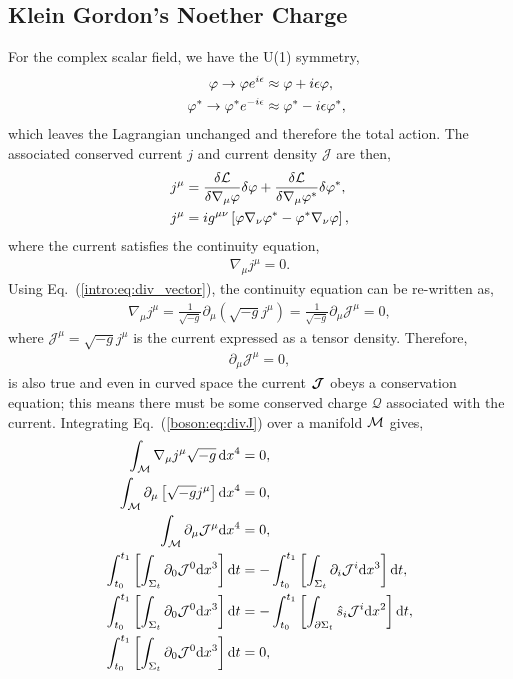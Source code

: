 \subsection{Klein Gordon's Noether Charge}
For the complex scalar field, we have the U(1) symmetry,
\begin{align}
\varphi \rightarrow \varphi e^{i\epsilon} &\approx \varphi + i\epsilon \varphi , \\ 
\quad\varphi^* \rightarrow \varphi^* e^{-i\epsilon}  &\approx \varphi^* - i\epsilon \varphi^*,
\end{align}
which leaves the Lagrangian unchanged and therefore the total action. The associated conserved current $j$ and current density $\mathcal{J}$ are then,
\begin{align} 
j^\mu &= \frac{\delta \mathcal{L}}{\delta \nabla_\mu\varphi}\delta \varphi + \frac{\delta \mathcal{L}}{\delta \nabla_\mu \varphi^*}\delta \varphi^*,\\
 j^\mu &=  ig^{\mu\nu}\left[\varphi\nabla_\nu\varphi^* - \varphi^*\nabla_\nu\varphi\right],
  \end{align}
  where the current satisfies the continuity equation,
\begin{align}
\nabla_\mu j^\mu = 0.
 \end{align}
Using Eq.~(\ref{intro:eq:div_vector}), the continuity equation can be re-written as,
\begin{align}
\nabla_\mu j^\mu = \frac{1}{\sqrt{-g}} \partial_\mu \left( \sqrt{-g} j^\mu \right) = \frac{1}{\sqrt{-g}} \partial_\mu \mathcal{J}^\mu = 0,
 \end{align}
 where $\mathcal{J}^\mu = \sqrt{-g}j^\mu$ is the current expressed as a tensor density. Therefore,
\begin{align}
\partial_\mu \mathcal{J}^\mu =0,\label{boson:eq:divJ}
 \end{align}
is also true and even in curved space the current $\boldsymbol{\mathcal{J}}$ obeys a conservation equation; this means there must be some conserved charge $\mathcal{Q}$ associated with the current. Integrating Eq.~(\ref{boson:eq:divJ}) over a manifold $\mathcal{M}$ gives,
\begin{align}
\int_{\mathcal{M}} \nabla_\mu j^\mu \sqrt{-g}\,\dd x^4 &= 0 ,\\
\int_{\mathcal{M}} \partial_\mu \left[\sqrt{-g} j^{\mu} \right] \dd x^4 &=0,\\
 \int_{\mathcal{M}}\partial_\mu \mathcal{J}^\mu \dd x^4&=0, \\ 
 \int^{t_1}_{t_0}\left[\int_{\Sigma_t} \partial_0 \mathcal{J}^0 \dd x^3 \right]\dd t &= -\int^{t_1}_{t_0}\left[\int_{\Sigma_t} \partial_i \mathcal{J}^i \dd x^3 \right]\dd t , \\
  \int^{t_1}_{t_0}\left[\int_{\Sigma_t} \partial_0 \mathcal{J}^0 \dd x^3 \right]\dd t &= -\int^{t_1}_{t_0}\left[\int_{\partial \Sigma_t} \hat{s}_i \mathcal{J}^i \dd x^2 \right]\dd t , \\
\int^{t_1}_{t_0}\left[\int_{\Sigma_t} \partial_0 \mathcal{J}^0 \dd x^3 \right]\dd t &= 0 \label{boson:eq:halfwaypointQ} ,
\end{align}

